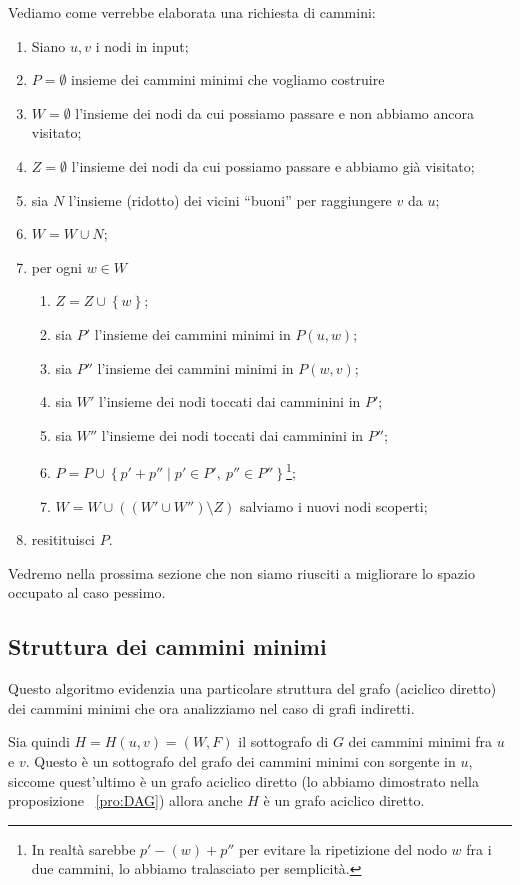 \documentclass[a4paper,10pt]{amsbook}
\theoremstyle{plain}
\theoremstyle{definition}
\theoremstyle{remark}
\newcommand{\set}[1]{\left\{#1\right\}}
\newcommand{\pa}[1]{\left(#1\right)}
\begin{document}
Vediamo come verrebbe elaborata una richiesta di cammini:
\begin{enumerate}
\item Siano $u,v$ i nodi in input;
\item $P = \emptyset$ insieme dei cammini minimi che vogliamo costruire
\item $W = \emptyset$ l'insieme dei nodi da cui possiamo passare e non
  abbiamo ancora visitato;
\item $Z = \emptyset$ l'insieme dei nodi da cui possiamo passare e
  abbiamo gi\`a visitato;
\item sia $N$ l'insieme (ridotto) dei vicini ``buoni'' per raggiungere
  $v$ da $u$;
\item $W = W \cup N$;
\item per ogni $w \in W$
  \begin{enumerate}
  \item $Z = Z \cup \set{w}$;
  \item sia $P'$ l'insieme dei cammini minimi in $P(u,w)$;
  \item sia $P''$ l'insieme dei cammini minimi in $P(w,v)$;
  \item sia $W'$ l'insieme dei nodi toccati dai camminini in $P'$;
  \item sia $W''$ l'insieme dei nodi toccati dai camminini in $P''$;
  \item $P = P \cup \set{ p' + p'' \mid p' \in P' , \ p'' \in
      P''}$\footnote{In realtà sarebbe $p' - (w) + p''$ per evitare la
      ripetizione del nodo $w$ fra i due cammini, lo abbiamo
      tralasciato per semplicit\`a.};
  \item $W = W \cup \pa{ \pa{ W' \cup W'' } \setminus Z }$ salviamo i
    nuovi nodi scoperti;
  \end{enumerate}
\item resitituisci $P$.
\end{enumerate}

Vedremo nella prossima sezione che non siamo riusciti a migliorare lo
spazio occupato al caso pessimo.

\subsection{Struttura dei cammini minimi}

Questo algoritmo evidenzia una particolare struttura del grafo
(aciclico diretto) dei cammini minimi che ora analizziamo nel caso di
grafi indiretti.

Sia quindi $H = H(u,v) = (W,F)$ il sottografo di $G$ dei cammini
minimi fra $u$ e $v$. Questo \`e un sottografo del grafo dei cammini
minimi con sorgente in $u$, siccome quest'ultimo \`e un grafo aciclico
diretto (lo abbiamo dimostrato nella proposizione~ \ref{pro:DAG})
allora anche $H$ \`e un grafo aciclico diretto.
\end{document}
